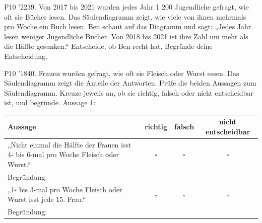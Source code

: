 \documentclass[11pt]{article}
\begin{document}
\begin{pfaufg}{P10 ’22}{39.}{}
Von 2017 bis 2021 wurden jedes Jahr 1 200 Jugendliche gefragt, wie oft sie Bücher lesen. Das Säulendiagramm zeigt, wie viele von ihnen mehrmals pro Woche ein Buch lesen. Ben schaut auf das Diagramm und sagt: „Jedes Jahr lesen weniger Jugendliche Bücher. Von 2018 bis 2021 ist ihre Zahl um mehr als die Hälfte gesunken.“ Entscheide, ob Ben recht hat. Begründe deine Entscheidung.
\par\smallskip\noindent {}\par
{}
\end{pfaufg}
\pfgruppe{}
\begin{pfaufg}{P10 ’18}{\llap{\textasteriskcentered\,}40.}{}
Frauen wurden gefragt, wie oft sie Fleisch oder Wurst essen. Das Säulendiagramm zeigt die Anteile der Antworten. Prüfe die beiden Aussagen zum Säulendiagramm. Kreuze jeweils an, ob sie richtig, falsch oder nicht entscheidbar ist, und begründe. Aussage 1:
\par\smallskip\noindent \begingroup\renewcommand{\arraystretch}{1.5}\begin{tabular}{|p{5.5cm}|c|c|c|}\hline Aussage & richtig & falsch & nicht entscheidbar \\ \hline „Nicht einmal die Hälfte der Frauen isst 4- bis 6-mal pro Woche Fleisch oder Wurst.“ & $\square$ & $\square$ & $\square$ \\ \hline \multicolumn{4}{|l|}{\rule{0pt}{3.2ex}\footnotesize\color{mbgrau}Begründung:} \\ \hline „1- bis 3-mal pro Woche Fleisch oder Wurst isst jede 15. Frau.“ & $\square$ & $\square$ & $\square$ \\ \hline \multicolumn{4}{|l|}{\rule{0pt}{3.2ex}\footnotesize\color{mbgrau}Begründung:} \\ \hline\end{tabular}\endgroup\par
{}
\end{pfaufg}
\end{document}
